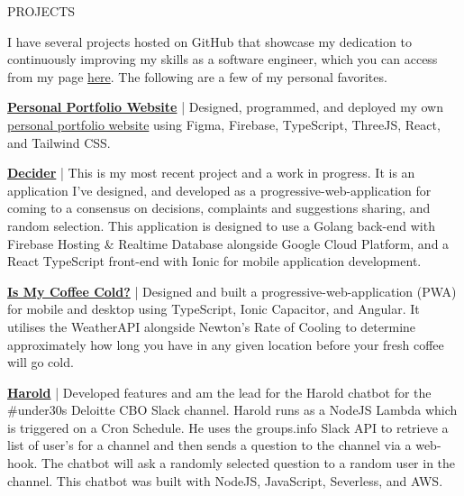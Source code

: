 \documentclass{resume} %
\begin{document}
\begin{rSection}{PROJECTS}
\vspace{-1.25em}
\item {I have several projects hosted on GitHub that showcase my dedication to continuously improving my skills as a software engineer, which you can access from my page \href{https://github.com/jamestkelly}{here}. The following are a few of my personal favorites.}
\item \textbf{\href{https://github.com/jamestkelly/personal-portfolio}{Personal Portfolio Website}} {| Designed, programmed, and deployed my own \href{https://jim-t-kelly.web.app}{personal portfolio website} using Figma, Firebase, TypeScript, ThreeJS, React, and Tailwind CSS.}
\item \textbf{\href{https://github.com/jamestkelly/decider}{Decider}} {| This is my most recent project and a work in progress. It is an application I've designed, and developed as a progressive-web-application for coming to a consensus on decisions, complaints and suggestions sharing, and random selection. This application is designed to use a Golang back-end with Firebase Hosting \& Realtime Database alongside Google Cloud Platform, and a React TypeScript front-end with Ionic for mobile application development.}
\item \textbf{\href{https://github.com/jamestkelly/is-my-coffee-cold}{Is My Coffee Cold?}} {| Designed and built a progressive-web-application (PWA) for mobile and desktop using TypeScript, Ionic Capacitor, and Angular. It utilises the WeatherAPI alongside Newton's Rate of Cooling to determine approximately how long you have in any given location before your fresh coffee will go cold.}
\item \textbf{\href{https://github.com/jamestkelly/harold}{Harold}} {| Developed features and am the lead for the Harold chatbot for the \#under30s Deloitte CBO Slack channel. Harold runs as a NodeJS Lambda which is triggered on a Cron Schedule. He uses the groups.info Slack API to retrieve a list of user's for a channel and then sends a question to the channel via a web-hook. The chatbot will ask a randomly selected question to a random user in the channel. This chatbot was built with NodeJS, JavaScript, Severless, and AWS.}

\end{rSection} 
\end{document}
